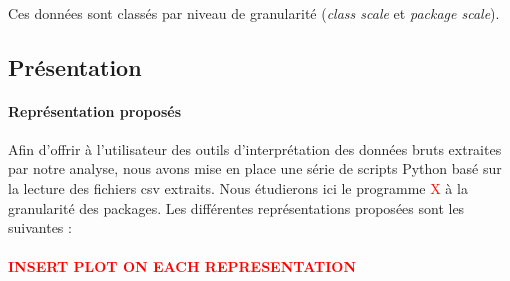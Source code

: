 \documentclass{scrartcl}
\newcommand{\TODO}[1] {
    \noindent \paragraph{\textcolor{red}{#1}}
}
\begin{document}
    \paragraph{}Ces données sont classés par niveau de granularité (\emph{class scale} et \emph{package scale}).

    \subsection{Présentation}

    \paragraph{Représentation proposés}Afin d'offrir à l'utilisateur des outils d'interprétation des données bruts extraites par notre analyse, nous avons mise en place une série de scripts Python basé sur la lecture des fichiers csv extraits. Nous étudierons ici le programme \textcolor{red}{X} à la granularité des packages. Les différentes représentations proposées sont les suivantes :
    \TODO{INSERT PLOT ON EACH REPRESENTATION}
\end{document}
